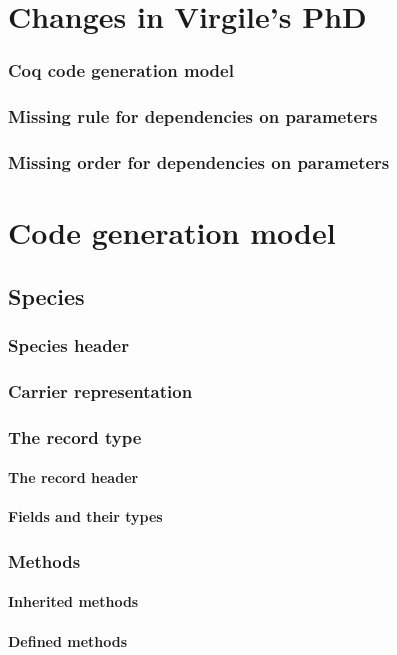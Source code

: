 \documentclass{book}
\begin{document}
\chapter{Changes in Virgile's PhD}
\subsection{Coq code generation model}
\subsection{Missing rule for dependencies on parameters}
\subsection{Missing order for dependencies on parameters}

\chapter{Code generation model}
\section{Species}
\subsection{Species header}
\subsection{Carrier representation}
\subsection{The record type}
\subsubsection{The record header}
\subsubsection{Fields and their types}
\subsection{Methods}
\subsubsection{Inherited methods}
\subsubsection{Defined methods}
\end{document}
